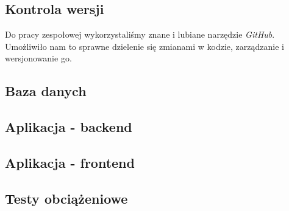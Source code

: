 \subsection{Kontrola wersji}
Do pracy zespołowej wykorzystaliśmy znane i lubiane narzędzie \textit{GitHub}. Umożliwiło nam to sprawne dzielenie się zmianami w kodzie, zarządzanie i wersjonowanie go.

\subsection{Baza danych}


\subsection{Aplikacja - backend}


\subsection{Aplikacja - frontend}


\subsection{Testy obciążeniowe}


